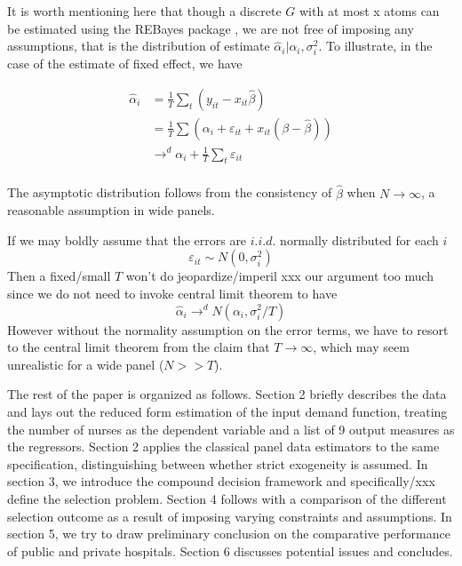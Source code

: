 \documentclass[12pt]{article}
\begin{document}
It is worth mentioning here that though a discrete $G$ with at most x atoms can
be estimated using the REBayes package \cite{koenker2017rebayes}, we are not
free of imposing any assumptions, that is the distribution of estimate
$\hat{\alpha}_i|\alpha_i,\sigma_i^2.$ To illustrate, in the case of the
estimate of fixed effect, we have

\begin{align*}
    \hat{\alpha}_i & =\frac{1}{T}\sum_t (y_{it}-x_{it}\hat{\beta})                         \\
                   & =\frac{1}{T}\sum(\alpha_i+\varepsilon_{it}+x_{it}(\beta-\hat{\beta})) \\
                   & \to^d \alpha_i+\frac{1}{T}\sum_t \varepsilon_{it}                     \\
\end{align*}

The asymptotic distribution follows from the consistency of $\hat{\beta}$ when
$N \to \infty$, a reasonable assumption in wide panels.

If we may boldly assume that the errors are $i.i.d.$ normally distributed for
each $i$
\begin{equation*}
    \varepsilon_{it} \sim N(0, \sigma_i^2)
\end{equation*}
Then a fixed/small $T$ won't do jeopardize/imperil xxx our argument too much since we do not need to invoke central
limit theorem to have
\begin{equation*}
    \hat{\alpha}_i\to^d N(\alpha_i,\sigma_i^2/T)
\end{equation*}
However without the normality assumption on the error terms, we have to resort to the
central limit theorem from the claim that $T\to \infty$, which may seem unrealistic for a wide panel ($N>>T$).

The rest of the paper is organized as follows. Section 2 briefly describes the
data and lays out the reduced form estimation of the input demand function,
treating the number of nurses as the dependent variable and a list of 9 output
measures as the regressors. Section 2 applies the classical panel data
estimators to the same specification, distinguishing between whether strict
exogeneity is assumed. In section 3, we introduce the compound decision
framework and specifically/xxx define the selection problem. Section 4 follows
with a comparison of the different selection outcome as a result of imposing
varying constraints and assumptions. In section 5, we try to draw preliminary
conclusion on the comparative performance of public and private hospitals.
Section 6 discusses potential issues and concludes.
\end{document}

